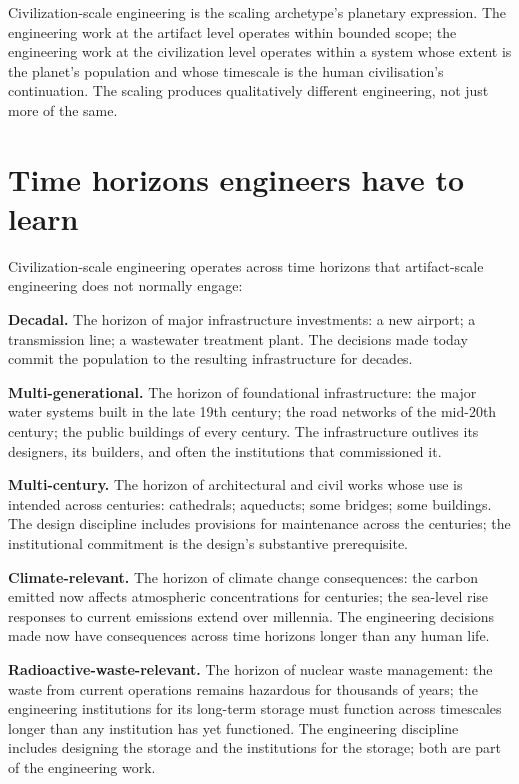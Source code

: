\begin{archetype}[scaling]
Civilization-scale engineering is the scaling archetype's planetary expression. The engineering work at the artifact level operates within bounded scope; the engineering work at the civilization level operates within a system whose extent is the planet's population and whose timescale is the human civilisation's continuation. The scaling produces qualitatively different engineering, not just more of the same.
\end{archetype}

\section{Time horizons engineers have to learn}

Civilization-scale engineering operates across time horizons that artifact-scale engineering does not normally engage:

\textbf{Decadal.} The horizon of major infrastructure investments: a new airport; a transmission line; a wastewater treatment plant. The decisions made today commit the population to the resulting infrastructure for decades.

\textbf{Multi-generational.} The horizon of foundational infrastructure: the major water systems built in the late 19th century; the road networks of the mid-20th century; the public buildings of every century. The infrastructure outlives its designers, its builders, and often the institutions that commissioned it.

\textbf{Multi-century.} The horizon of architectural and civil works whose use is intended across centuries: cathedrals; aqueducts; some bridges; some buildings. The design discipline includes provisions for maintenance across the centuries; the institutional commitment is the design's substantive prerequisite.

\textbf{Climate-relevant.} The horizon of climate change consequences: the carbon emitted now affects atmospheric concentrations for centuries; the sea-level rise responses to current emissions extend over millennia. The engineering decisions made now have consequences across time horizons longer than any human life.

\textbf{Radioactive-waste-relevant.} The horizon of nuclear waste management: the waste from current operations remains hazardous for thousands of years; the engineering institutions for its long-term storage must function across timescales longer than any institution has yet functioned. The engineering discipline includes designing the storage and the institutions for the storage; both are part of the engineering work.

